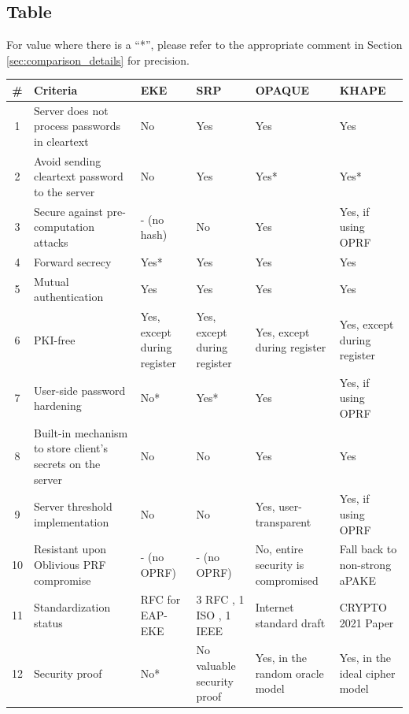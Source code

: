 ﻿\documentclass[../report.tex]{subfiles}
\begin{document}
\subsection{Table}
For value where there is a ``*'', please refer to the appropriate comment in Section \ref{sec:comparison_details} for precision.
\begin{center}
   \begin{tabular}{ | c | p{5cm} || p{2cm} | p{2cm} | p{2cm} | p{2cm} | }
     \hline
     \textbf{\#} & \textbf{Criteria} & \textbf{EKE} & \textbf{SRP} & \textbf{OPAQUE} & \textbf{KHAPE} \\ \hline
     
     
     
     1 & Server does not process passwords in cleartext & No & Yes & Yes & Yes \\ \hline
     2 & Avoid sending cleartext password to the server & No & Yes & Yes* & Yes* \\ \hline
     
     3 & Secure against pre-computation attacks & - (no hash) & No & Yes & Yes, if using OPRF \\ \hline
     4 & Forward secrecy & Yes* & Yes & Yes & Yes \\ \hline
     5 & Mutual authentication & Yes & Yes & Yes & Yes \\ \hline
     6 & PKI-free & Yes, except during register & Yes, except during register & Yes, except during register & Yes, except during register \\ \hline
     7 & User-side password hardening & No* & Yes* & Yes & Yes, if using OPRF \\ \hline
     8 & Built-in mechanism to store client's secrets on the server & No & No & Yes & Yes \\ \hline
     9 & Server threshold implementation & No & No & Yes, user-transparent & Yes, if using OPRF \\ \hline
     10 & Resistant upon Oblivious PRF compromise & - (no OPRF) & - (no OPRF) & No, entire security is compromised & Fall back to non-strong aPAKE \\ \hline
     11 & Standardization status & RFC for EAP-EKE \cite{EAP_EKE_RFC} & 3 RFC \cite{SRP_RFC_1, SRP_RFC_2, SRP_RFC_3}, 1 ISO \cite{SRP_ISO}, 1 IEEE \cite{SRP_IEEE} & Internet standard draft \cite{OPAQUE_Standard_Draft} & CRYPTO 2021 Paper \cite{KHAPE_Paper} \\ \hline
     12 & Security proof & No* & No valuable security proof & Yes, in the random oracle model & Yes, in the ideal cipher model \\ \hline
     
     \end{tabular}
 \end{center}
 
\end{document}
